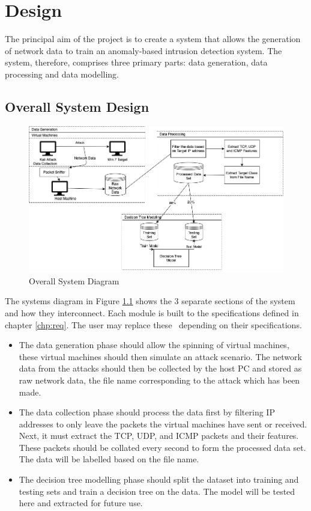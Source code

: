 \chapter{Design}\label{chp:reqdes}
The principal aim of the project is to create a system that allows the generation of network data to train an anomaly-based intrusion detection system. The system, therefore, comprises three primary parts: data generation, data processing and data modelling. 

\section{Overall System Design}
\begin{figure}[H]
\centering
\includegraphics[scale = 0.45]{Images/Mainsystem.png}
\caption{Overall System Diagram}
\label{fig:osd}
\end{figure}

The systems diagram in Figure \ref{fig:osd} shows the 3 separate sections of the system and how they interconnect. Each module is built to the specifications defined in chapter \ref{chp:req}. The user may replace these \ depending on their specifications. 

\begin{itemize}
\item The data generation phase should allow the spinning of virtual machines, these virtual machines should then simulate an attack scenario. The network data from the attacks should then be collected by the host PC and stored as raw network data, the file name corresponding to the attack which has been made.
\item The data collection phase should process the data first by filtering IP addresses to only leave the packets the virtual machines have sent or received. Next, it must extract the TCP, UDP, and ICMP packets and their features. These packets should be collated every second to form the processed data set. The data will be labelled based on the file name. 
\item The decision tree modelling phase should split the dataset into training and testing sets and train a decision tree on the data. The model will be tested here and extracted for future use.
\end{itemize}

